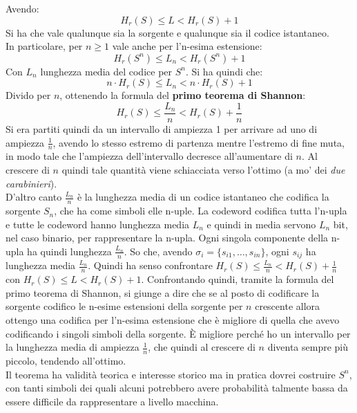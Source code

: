 \documentclass[a4paper,12pt, oneside]{book}
\begin{document}
\begin{teorema}
  Avendo:
  \[H_r(S)\leq L< H_r(S)+1\]
  Si ha che vale qualunque sia la sorgente e qualunque sia il codice
  istantaneo.\\
  In particolare, per $n\geq 1$ vale anche per l'n-esima estensione:
  \[H_r(S^n)\leq L_n< H_r(S^n)+1\]
  Con $L_n$ lunghezza media del codice per $S^n$. Si ha quindi che:
  \[n\cdot H_r(S)\leq L_n< n\cdot H_r(S)+1\]
  Divido per $n$, ottenendo la formula del \textbf{primo teorema di Shannon}:
  \[H_r(S)\leq \frac{L_n}{n}< H_r(S)+\frac{1}{n}\]
  Si era partiti quindi da un intervallo di ampiezza 1 per arrivare ad uno di
  ampiezza $\frac{1}{n}$, avendo lo stesso estremo di partenza mentre l'estremo
  di fine muta, in modo tale che l'ampiezza dell'intervallo decresce
  all'aumentare di $n$.
  Al crescere di $n$ quindi tale quantità viene schiacciata verso l'ottimo (a
  mo' dei 
  \textit{due carabinieri}).\\
  D'altro canto $\frac{L_n}{n}$ è la lunghezza media di un codice istantaneo che
  codifica la sorgente $S_n$, che ha come simboli elle n-uple. La codeword
  codifica tutta l'n-upla e tutte le codeword hanno lunghezza media $L_n$ e
  quindi in media servono $L_n$ bit, nel caso binario, per rappresentare la
  n-upla. Ogni singola componente della n-upla ha quindi lunghezza
  $\frac{L_n}{n}$. 
  So che, avendo $\sigma_i=\{s_{i1},\ldots, s_{in}\}$,
  ogni $s_{ij}$ ha lunghezza media $\frac{L_n}{n}$. Quindi ha senso
  confrontare 
  $H_r(S)\leq \frac{L_n}{n}< H_r(S)+\frac{1}{n}$ con $H_r(S)\leq L<
  H_r(S)+1$. Confrontando quindi, tramite la formula del primo teorema di
  Shannon, si giunge a dire che se al posto di codificare la 
  sorgente codifico le n-esime estensioni della sorgente per $n$ crescente
  allora ottengo una codifica per l'n-esima estensione che è migliore di quella
  che avevo codificando i singoli simboli della sorgente. È migliore perché ho
  un intervallo per la lunghezza media di ampiezza $\frac{1}{n}$, che quindi al
  crescere di $n$ diventa sempre più piccolo, tendendo all'ottimo.\\
  Il teorema ha validità teorica e interesse storico ma in pratica dovrei
  costruire $S^n$, con tanti 
  simboli dei quali alcuni potrebbero avere probabilità talmente bassa da essere
  difficile da rappresentare a livello macchina.
\end{teorema}
\end{document}
